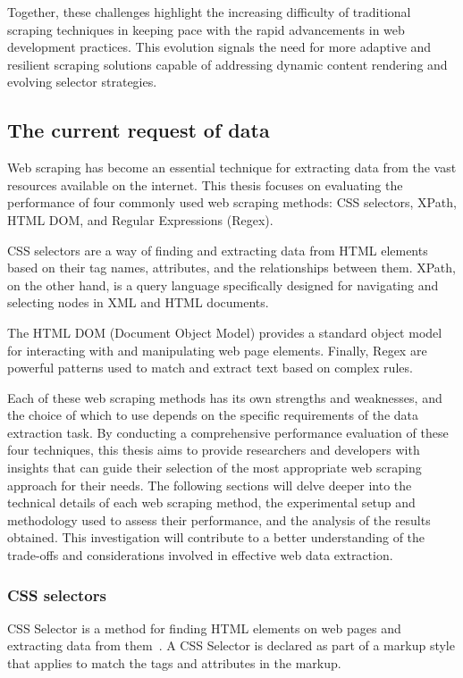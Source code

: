Together, these challenges highlight the increasing difficulty of traditional scraping techniques in keeping pace with the rapid advancements in web development practices. This evolution signals the need for more adaptive and resilient scraping solutions capable of addressing dynamic content rendering and evolving selector strategies.

\subsection{The current request of data}
Web scraping has become an essential technique for extracting data from the vast resources available on the internet. This thesis focuses on evaluating the performance of four commonly used web scraping methods: CSS selectors, XPath, HTML DOM, and Regular Expressions (Regex).

CSS selectors are a way of finding and extracting data from HTML elements based on their tag names, attributes, and the relationships between them. XPath, on the other hand, is a query language specifically designed for navigating and selecting nodes in XML and HTML documents. 

The HTML DOM (Document Object Model) provides a standard object model for interacting with and manipulating web page elements. Finally, Regex are powerful patterns used to match and extract text based on complex rules.

Each of these web scraping methods has its own strengths and weaknesses, and the choice of which to use depends on the specific requirements of the data extraction task. By conducting a comprehensive performance evaluation of these four techniques, this thesis aims to provide researchers and developers with insights that can guide their selection of the most appropriate web scraping approach for their needs.
The following sections will delve deeper into the technical details of each web scraping method, the experimental setup and methodology used to assess their performance, and the analysis of the results obtained. This investigation will contribute to a better understanding of the trade-offs and considerations involved in effective web data extraction.
\subsubsection{CSS selectors}
CSS Selector is a method for finding HTML elements on web pages and extracting data from them~\cite{8}. A CSS Selector is declared as part of a markup style that applies to match the tags and attributes in the markup.
